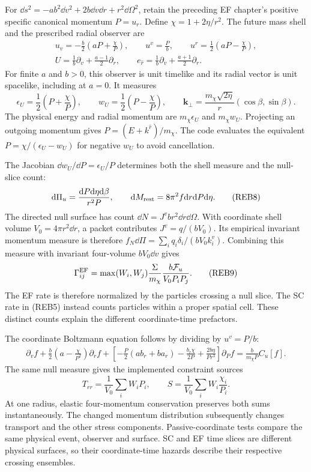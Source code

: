For \(\dd s^2=-ab^2\dd v^2+2b\dd v\dd r+r^2\dd\Omega^2\), retain
the preceding EF chapter's positive specific canonical momentum \(P=u_r\).
Define \(\chi=1+2\eta/r^2\). The future mass shell and the prescribed
radial observer are
\[
 \begin{gathered}
 u_v=-\frac b2\left(aP+\frac\chi P\right),\qquad
 u^v=\frac P b,\qquad
 u^r=\frac12\left(aP-\frac\chi P\right),\\
 U=\frac1b\partial_v+\frac{a-1}{2}\partial_r,\qquad
 e_{\hat r}=\frac1b\partial_v+\frac{a+1}{2}\partial_r.
 \end{gathered}\tag{REB6}
\]
For finite \(a\) and \(b>0\), this observer is unit timelike and its
radial vector is unit spacelike, including at \(a=0\). It measures
\[
 \epsilon_U=\frac12\left(P+\frac\chi P\right),\qquad
 w_U=\frac12\left(P-\frac\chi P\right),\qquad
 \boldsymbol{k}_\perp=
   \frac{m_\chi\sqrt{2\eta}}r(\cos\beta,\sin\beta).
 \tag{REB7}
\]
The physical energy and radial momentum are \(m_\chi\epsilon_U\) and
\(m_\chi w_U\). Projecting an outgoing momentum gives
\(P=(E+k^{\hat r})/m_\chi\). The code evaluates the equivalent
\(P=\chi/(\epsilon_U-w_U)\) for negative \(w_U\) to avoid cancellation.

The Jacobian \(\dd w_U/\dd P=\epsilon_U/P\) determines both the
shell measure and the null-slice count:
\[
 \mathrm d\Pi_u=\frac{\mathrm d P\mathrm d\eta\mathrm d\beta}{r^2P},\qquad
 \mathrm d M_{\rm rest}=8\pi^2 f\mathrm d r\mathrm d P\mathrm d\eta.
 \tag{REB8}
\]
The directed null surface has count
\(\dd N=J^v b r^2\dd r\dd\Omega\). With coordinate shell volume
\(V_0=4\pi r^2\dd r\), a packet contributes
\(J^v=q/(bV_0)\). Its empirical invariant momentum measure is therefore
\(f_N\dd\Pi=\sum_iq_i\delta_i/(bV_0k_i^v)\). Combining this measure
with invariant four-volume \(bV_0\dd v\) gives
\[
 \Gamma_{ij}^{\rm EF}
 =\max(W_i,W_j)\frac{\Sigma}{m_\chi}
   \frac{b\mathcal F_u}{V_0P_iP_j}.
 \tag{REB9}
\]
The EF rate is therefore normalized by the particles crossing a null slice.
The SC rate in (REB5) instead counts particles within a proper spatial cell.
These distinct counts explain the different coordinate-time prefactors.

The coordinate Boltzmann equation follows by dividing by \(u^v=P/b\):
\[
 \begin{split}
 \partial_v f+\frac b2\left(a-\frac\chi{P^2}\right)\partial_r f
 +\left[-\frac P2(ab_r+ba_r)-\frac{b_r\chi}{2P}
           +\frac{2b\eta}{Pr^3}\right]\partial_P f
 =\frac b{m_\chi P}C_u[f].
 \end{split}\tag{REB10}
\]
The same null measure gives the implemented constraint sources
\[
 T_{rr}=\frac1{V_0}\sum_iW_iP_i,\qquad
 S=\frac1{V_0}\sum_iW_i\frac{\chi_i}{P_i}.
 \tag{REB11}
\]
At one radius, elastic four-momentum conservation preserves both sums
instantaneously. The changed momentum distribution subsequently changes
transport and the other stress components. Passive-coordinate tests compare
the same physical event, observer and surface. SC and EF time slices are
different physical surfaces, so their coordinate-time hazards describe
their respective crossing ensembles.

